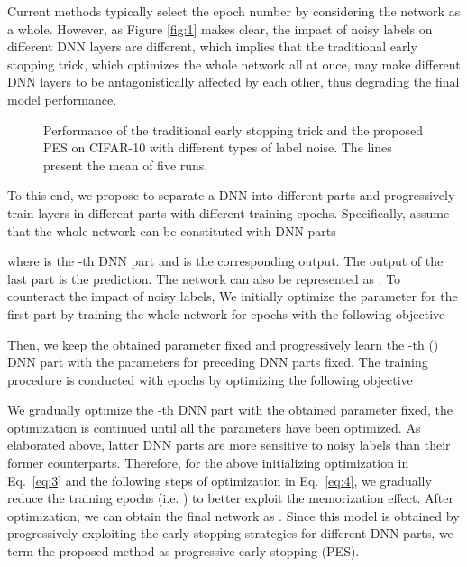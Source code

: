 \documentclass[11pt]{article}
\begin{document}
Current methods typically select the epoch number  by considering the network as a whole. However, as Figure \ref{fig:1} makes clear, the impact of noisy labels on different DNN layers are different, which implies that the traditional early stopping trick, which optimizes the whole network all at once, may make different DNN layers to be antagonistically affected by each other, thus degrading the final model performance. 
\begin{figure}[!t]
\centering
{} 
\caption{Performance of the traditional early stopping trick and the proposed PES on CIFAR-10 with different types of label noise. The lines present the mean of five runs.}
\label{fig:2}
\end{figure}


To this end, we propose to separate a DNN into different parts and progressively train layers in different parts with different training epochs. Specifically, assume that the whole network  can be constituted with  DNN parts


\indent where  is the -th DNN part and  is the corresponding output. The output of the last part  is the prediction. The network  can also be represented as . To counteract the impact of noisy labels, We initially optimize the parameter  for the first part by training the whole network for  epochs with the following objective

Then, we keep the obtained parameter  fixed and progressively learn the -th () DNN part with the parameters for preceding DNN parts fixed. The training procedure is conducted with   epochs by optimizing the following objective

We gradually optimize the -th DNN part with the obtained parameter  fixed, the optimization is continued until all the parameters have been optimized. As elaborated above, latter DNN parts are more sensitive to noisy labels than their former counterparts. Therefore, for the above initializing optimization in Eq.~\eqref{eq:3} and the following  steps of optimization in Eq.~\eqref{eq:4}, we gradually reduce the training epochs (i.e. ) to better exploit the memorization effect. 
After optimization, we can obtain the final network as . 
Since this model is obtained by progressively exploiting the early stopping strategies for different DNN parts, we term the proposed method as progressive early stopping (PES). 
\end{document}
